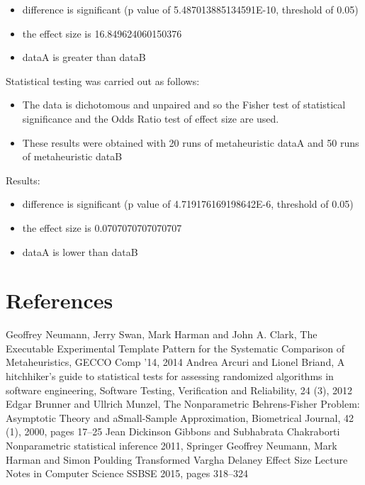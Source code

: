 \documentclass[]{article}
\begin{document}
\begin{itemize}
\item{difference is significant (p value of 5.487013885134591E-10, threshold of 0.05)}
\item{the effect size is 16.849624060150376}
\item{dataA is greater than dataB}
\end{itemize}Statistical testing was carried out as follows: \begin{itemize}
\item{The data is dichotomous and unpaired and so the Fisher test of statistical significance and the Odds Ratio test of effect size are used.}
\item{These results were obtained with 20 runs of metaheuristic dataA and 50 runs of metaheuristic dataB}
\end{itemize}Results:
\begin{itemize}
\item{difference is significant (p value of 4.719176169198642E-6, threshold of 0.05)}
\item{the effect size is 0.0707070707070707}
\item{dataA is lower than dataB}
\end{itemize}

\section{References}


\begin{thebibliography}{99}
Geoffrey Neumann, Jerry Swan, Mark Harman and John A. Clark,
The Executable Experimental Template Pattern for the Systematic Comparison of Metaheuristics,
GECCO Comp '14,
2014
Andrea Arcuri and Lionel Briand,
A hitchhiker's guide to statistical tests for assessing randomized algorithms in software engineering,
Software Testing, Verification and Reliability, 24 (3),
2012
Edgar Brunner and Ullrich Munzel, 
The Nonparametric Behrens-Fisher Problem: Asymptotic Theory and aSmall-Sample Approximation, 
Biometrical Journal, 42 (1), 
2000, 
pages 17--25
Jean Dickinson Gibbons and Subhabrata Chakraborti 
Nonparametric statistical inference 
2011, 
Springer
Geoffrey Neumann, Mark Harman and Simon Poulding 
Transformed Vargha Delaney Effect Size 
Lecture Notes in Computer Science 
SSBSE 
2015, 
pages 318--324
\end{thebibliography}
\end{document}
